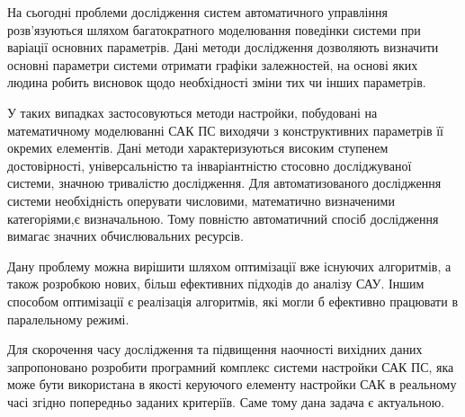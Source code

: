 На сьогодні проблеми дослідження систем автоматичного управління 
розв'язуються шляхом багатократного моделювання поведінки системи
при варіації основних параметрів. Дані методи дослідження дозволяють
визначити основні параметри системи отримати графіки залежностей,
на основі яких людина робить висновок щодо необхідності зміни 
тих чи інших параметрів. 

У таких випадках застосовуються методи настройки, побудовані на 
математичному моделюванні САК ПС виходячи з конструктивних 
параметрів її окремих елементів. Дані методи характеризуються високим 
ступенем достовірності, універсальністю та інваріантністю стосовно 
досліджуваної системи, значною тривалістю дослідження. Для автоматизованого 
дослідження системи необхідність оперувати числовими, математично 
визначеними категоріями,є визначальною. Тому повністю автоматичний 
спосіб дослідження вимагає значних обчислювальних ресурсів.

Дану проблему можна вирішити шляхом оптимізації вже існуючих алгоритмів,
а також розробкою нових, більш ефективних підходів до аналізу САУ.
Іншим способом оптимізації є реалізація алгоритмів, які могли б 
ефективно працювати в паралельному режимі.

Для скорочення часу дослідження та підвищення наочності вихідних даних 
запропоновано розробити програмний комплекс системи настройки САК ПС, 
яка може бути використана в якості керуючого елементу настройки САК в 
реальному часі згідно попередньо заданих критеріїв. Саме тому дана задача
є актуальною.